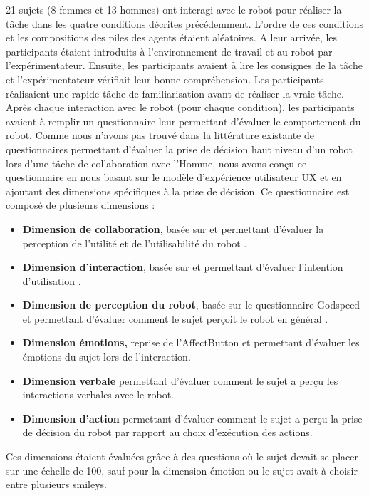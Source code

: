 \documentclass[english,a4paper,11pt,twoside]{StyleThese}
\begin{document}
21 sujets (8 femmes et 13 hommes) ont interagi avec le robot pour réaliser la tâche dans les quatre conditions décrites précédemment. L'ordre de ces conditions et les compositions des piles des agents étaient aléatoires.
A leur arrivée, les participants étaient introduits à l'environnement de travail et au robot par l’expérimentateur. Ensuite, les participants avaient à lire les consignes de la tâche et l’expérimentateur vérifiait leur bonne compréhension. Les participants réalisaient une rapide tâche de familiarisation avant de réaliser la vraie tâche.
Après chaque interaction avec le robot (pour chaque condition), les participants avaient à remplir un questionnaire leur permettant d'évaluer le comportement du robot. Comme nous n'avons pas trouvé dans la littérature existante de questionnaires permettant d'évaluer la prise de décision haut niveau d'un robot lors d'une tâche de collaboration avec l'Homme, nous avons conçu ce questionnaire en nous basant sur le modèle d'expérience utilisateur UX \cite{mahlke2008user} et en ajoutant des dimensions spécifiques à la prise de décision. Ce questionnaire est composé de plusieurs dimensions :
\begin{itemize}
\item \textbf{Dimension de collaboration}, basée sur \cite{weistroffer2014etude} et permettant d'évaluer la perception de l'utilité et de l'utilisabilité du robot \cite{davis1989perceived}.
\item \textbf{Dimension d'interaction}, basée sur \cite{lallemand2015creation} et permettant d'évaluer l'intention d'utilisation \cite{davis1989perceived}.
\item \textbf{Dimension de perception du robot}, basée sur le questionnaire Godspeed \cite{bartneck2009measurement} et permettant d'évaluer comment le sujet perçoit le robot en général \cite{hassenzahl2003thing}.
\item \textbf{Dimension émotions,} reprise de l'AffectButton \cite{broekens2013affectbutton} et permettant d'évaluer les émotions du sujet lors de l'interaction.
\item \textbf{Dimension verbale} permettant d'évaluer comment le sujet a perçu les interactions verbales avec le robot.
\item \textbf{Dimension d'action} permettant d'évaluer comment le sujet a perçu la prise de décision du robot par rapport au choix d’exécution des actions.
\end{itemize}
Ces dimensions étaient évaluées grâce à des questions où le sujet devait se placer sur une échelle de 100, sauf pour la dimension émotion ou le sujet avait à choisir entre plusieurs smileys.
\end{document}
